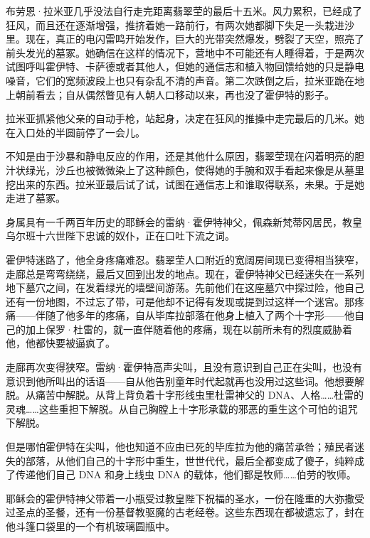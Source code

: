 \documentclass[AutoFakeBold=true]{book}
\begin{document}
\vspace*{1em}

布劳恩·拉米亚几乎没法自行走完距离翡翠茔的最后十五米。风力累积，已经成了狂风，而且还在逐渐增强，推挤着她一路前行，有两次她都脚下失足一头栽进沙里。现在，真正的电闪雷鸣开始发作，巨大的光带突然爆发，劈裂了天空，照亮了前头发光的墓冢。她确信在这样的情况下，营地中不可能还有人睡得着，于是两次试图呼叫霍伊特、卡萨德或者其他人，但她的通信志和植入物回馈给她的只是静电噪音，它们的宽频波段上也只有杂乱不清的声音。第二次跌倒之后，拉米亚跪在地上朝前看去；自从偶然瞥见有人朝人口移动以来，再也没了霍伊特的影子。

拉米亚抓紧他父亲的自动手枪，站起身，决定在狂风的推搡中走完最后的几米。她在入口处的半圆前停了一会儿。

不知是由于沙暴和静电反应的作用，还是其他什么原因，翡翠茔现在闪着明亮的胆汁状绿光，沙丘也被微微染上了这种颜色，使得她的手腕和双手看起来像是从墓里挖出来的东西。拉米亚最后试了试，试图在通信志上和谁取得联系，未果。于是她走进了墓冢。

\vspace*{1em}

身属具有一千两百年历史的耶稣会的雷纳·霍伊特神父，佩森新梵蒂冈居民，教皇乌尔班十六世陛下忠诚的奴仆，正在口吐下流之词。

霍伊特迷路了，他全身疼痛难忍。翡翠茔人口附近的宽阔房间现已变得相当狭窄，走廊总是弯弯绕绕，最后又回到出发的地点。现在，霍伊特神父已经迷失在一系列地下墓穴之间，在发着绿光的墙壁间游荡。先前他们在这座墓穴中探过险，他自己还有一份地图，不过忘了带，可是他却不记得有发现或提到过这样一个迷宫。那疼痛——伴随了他多年的疼痛，自从毕库拉部落在他身上植入了两个十字形——他自己的加上保罗·杜雷的，就一直伴随着他的疼痛，现在以前所未有的烈度威胁着他，他都快要被逼疯了。

走廊再次变得狭窄。雷纳·霍伊特高声尖叫，且没有意识到自己正在尖叫，也没有意识到他所叫出的话语——自从他告别童年时代起就再也没用过这些词。他想要解脱。从痛苦中解脱。从背上背负着十字形线虫里杜雷神父的 DNA、人格……杜雷的{\kaishu 灵魂}……这些重担下解脱。从自己胸膛上十字形承载的邪恶的重生这个可怕的诅咒下解脱。

但是哪怕霍伊特在尖叫，他也知道不应由已死的毕库拉为他的痛苦承咎；殖民者迷失的部落，从他们自己的十字形中重生，世世代代，最后全都变成了傻子，纯粹成了传递他们自己 DNA 和身上线虫 DNA 的载体，他们都是牧师……伯劳的牧师。

耶稣会的霍伊特神父带着一小瓶受过教皇陛下祝福的圣水，一份在隆重的大弥撒受过圣点的圣餐，还有一份基督教驱魔的古老经卷。这些东西现在都被遗忘了，封在他斗篷口袋里的一个有机玻璃圆瓶中。
\end{document}
